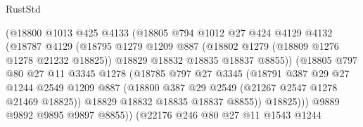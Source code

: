 \begin{lexlean}{RustStd}
\begin{coremodule}
                              (@18800
                                @1013
                                @425
                                @4133
                                (@18805
                                  @794
                                  @1012
                                  @27
                                  @424
                                  @4129
                                  @4132
                                  (@18787
                                    @4129
                                    (@18795
                                      @1279
                                      @1209
                                      @887
                                      (@18802 @1279 (@18809 @1276 @1278 @21232 @18825))
                                      @18829
                                      @18832
                                      @18835
                                      @18837
                                      @8855))
                                  (@18805
                                    @797
                                    @80
                                    @27
                                    @11
                                    @3345
                                    @1278
                                    (@18785
                                      @797
                                      @27
                                      @3345
                                      (@18791
                                        @387
                                        @29
                                        @27
                                        @1244
                                        @2549
                                        @1209
                                        @887
                                        (@18800 @387 @29 @2549 (@21267 @2547 @1278 @21469 @18825))
                                        @18829
                                        @18832
                                        @18835
                                        @18837
                                        @8855))
                                    @18825)))
                              @9889
                              @9892
                              @9895
                              @9897
                              @8855))
                          (@22176
                            @246
                            @80
                            @27
                            @11
                            @1543
                            @1244

\end{coremodule}
\end{lexlean}
